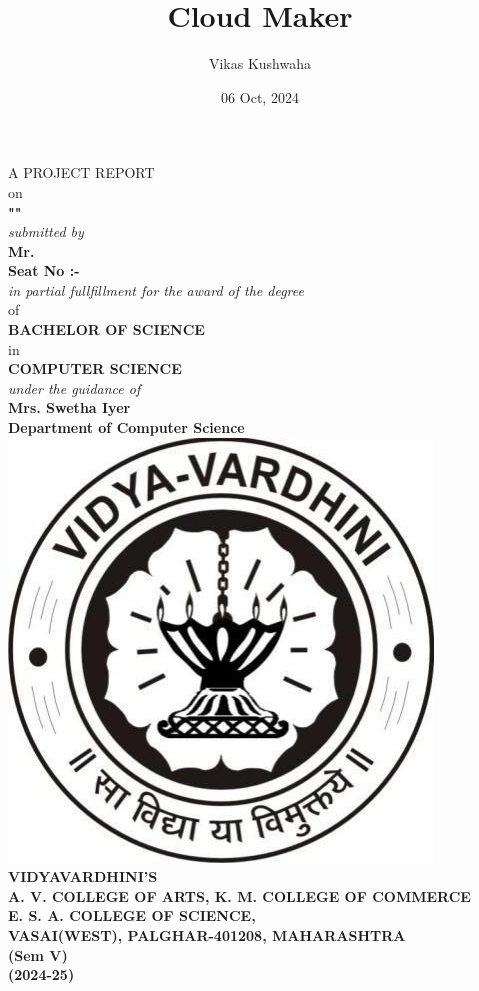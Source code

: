 \documentclass[12pt]{article}
\date{06 Oct, 2024}
\title{Cloud Maker}
\author{Vikas Kushwaha}
\makeatletter
\let\inserttitle\@title
\let\insertauthor\@author
\makeatother
\begin{document}
\begin{center}
	\fontsize{14pt}{28pt}\selectfont
	A PROJECT REPORT \\
	on \\
	\textbf{"\underline{\MakeUppercase{\inserttitle}}"} \\
	\textit{submitted by} \\
	\textbf{Mr. \insertauthor} \\
	\textbf{Seat No :-} \\
	\textit{in partial fullfillment for the award of the degree} \\
	of \\
	\textbf{BACHELOR OF SCIENCE} \\
	in \\
	\textbf{COMPUTER SCIENCE} \\
	\textit{under the guidance of} \\
	\textbf{Mrs. Swetha Iyer} \\
	\textbf{Department of Computer Science} \\
	\vspace{1cm}
	\includegraphics[scale=0.25]{vartak-logo} \\
	\fontsize{14pt}{20pt}\selectfont
	\textbf{VIDYAVARDHINI'S} \\
	\textbf{A. V. COLLEGE OF ARTS, K. M. COLLEGE OF COMMERCE} \\
	\textbf{E. S. A. COLLEGE OF SCIENCE,} \\
	\textbf{VASAI(WEST), PALGHAR-401208, MAHARASHTRA} \\
	\fontsize{14pt}{28pt}\selectfont
	\textbf{(Sem V)} \\
	\textbf{(2024-25)} \\
\end{center}
\end{document}
